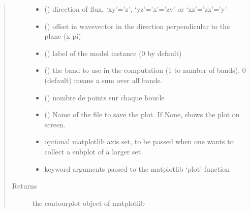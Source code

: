 \documentclass[letterpaper,10pt,english]{sphinxmanual}
\begin{document}
\begin{fulllineitems}
\begin{quote}
\begin{description}
\begin{itemize}
\item {} 
\sphinxAtStartPar
{} () \textendash{} direction of flux, ‘xy’=’z’, ‘yz’=’x’=’zy’ or ‘xz’=’zx’=’y’

\item {} 
\sphinxAtStartPar
{} () \textendash{} offset in wavevector in the direction perpendicular to the plane (x pi)

\item {} 
\sphinxAtStartPar
{} () \textendash{} label of the model instance (0 by default)

\item {} 
\sphinxAtStartPar
{} () \textendash{} the band to use in the computation (1 to number of bands). 0 (default) means a sum over all bands.

\item {} 
\sphinxAtStartPar
{} () \textendash{} nombre de points sur chaque boucle

\item {} 
\sphinxAtStartPar
{} () \textendash{} Name of the file to save the plot. If None, shows the plot on screen.

\item {} 
\sphinxAtStartPar
{} \textendash{} optional matplotlib axis set, to be passed when one wants to collect a subplot of a larger set

\item {} 
\sphinxAtStartPar
{} \textendash{} keyword arguments passed to the matplotlib ‘plot’ function

\end{itemize}

\item[{Returns}] \leavevmode
\sphinxAtStartPar
the contourplot object of matplotlib

\end{description}\end{quote}

\end{fulllineitems}
\end{document}
